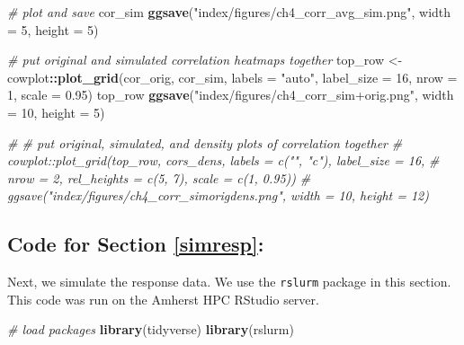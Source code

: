 \documentclass[12pt, twoside]{amherstthesis}
\newenvironment{Shaded}{\begin{snugshade}}{\end{snugshade}}
\newcommand{\AttributeTok}[1]{\textcolor[rgb]{0.13,0.29,0.53}{#1}}
\newcommand{\CommentTok}[1]{\textcolor[rgb]{0.56,0.35,0.01}{\textit{#1}}}
\newcommand{\DecValTok}[1]{\textcolor[rgb]{0.00,0.00,0.81}{#1}}
\newcommand{\FloatTok}[1]{\textcolor[rgb]{0.00,0.00,0.81}{#1}}
\newcommand{\FunctionTok}[1]{\textcolor[rgb]{0.13,0.29,0.53}{\textbf{#1}}}
\newcommand{\NormalTok}[1]{#1}
\newcommand{\OtherTok}[1]{\textcolor[rgb]{0.56,0.35,0.01}{#1}}
\newcommand{\SpecialCharTok}[1]{\textcolor[rgb]{0.81,0.36,0.00}{\textbf{#1}}}
\newcommand{\StringTok}[1]{\textcolor[rgb]{0.31,0.60,0.02}{#1}}
\begin{document}
\begin{Shaded}
\begin{Highlighting}[]
\CommentTok{\# plot and save}
\NormalTok{cor\_sim}
\FunctionTok{ggsave}\NormalTok{(}\StringTok{"index/figures/ch4\_corr\_avg\_sim.png"}\NormalTok{, }\AttributeTok{width =} \DecValTok{5}\NormalTok{, }\AttributeTok{height =} \DecValTok{5}\NormalTok{)}

\CommentTok{\# put original and simulated correlation heatmaps together}
\NormalTok{top\_row }\OtherTok{\textless{}{-}}\NormalTok{ cowplot}\SpecialCharTok{::}\FunctionTok{plot\_grid}\NormalTok{(cor\_orig, cor\_sim, }\AttributeTok{labels =} \StringTok{"auto"}\NormalTok{, }\AttributeTok{label\_size =} \DecValTok{16}\NormalTok{, }
                   \AttributeTok{nrow =} \DecValTok{1}\NormalTok{, }\AttributeTok{scale =} \FloatTok{0.95}\NormalTok{)}
\NormalTok{top\_row}
\FunctionTok{ggsave}\NormalTok{(}\StringTok{"index/figures/ch4\_corr\_sim+orig.png"}\NormalTok{, }\AttributeTok{width =} \DecValTok{10}\NormalTok{, }\AttributeTok{height =} \DecValTok{5}\NormalTok{)}

\CommentTok{\# \# put original, simulated, and density plots of correlation together}
\CommentTok{\# cowplot::plot\_grid(top\_row, cors\_dens, labels = c("", "c"), label\_size = 16, }
\CommentTok{\#                    nrow = 2, rel\_heights = c(5, 7), scale = c(1, 0.95))}
\CommentTok{\# ggsave("index/figures/ch4\_corr\_simorigdens.png", width = 10, height = 12)}
\end{Highlighting}
\end{Shaded}
\normalsize

\hypertarget{code-for-section-refsimresp}{%
\subsection{Code for Section \ref{simresp}:}\label{code-for-section-refsimresp}}

Next, we simulate the response data. We use the \texttt{rslurm} package in this section. This code was run on the Amherst HPC RStudio server.

\scriptsize
\begin{Shaded}
\begin{Highlighting}[]
\CommentTok{\# load packages}
\FunctionTok{library}\NormalTok{(tidyverse)}
\FunctionTok{library}\NormalTok{(rslurm)}
\end{Highlighting}
\end{Shaded}
\normalsize
\end{document}
